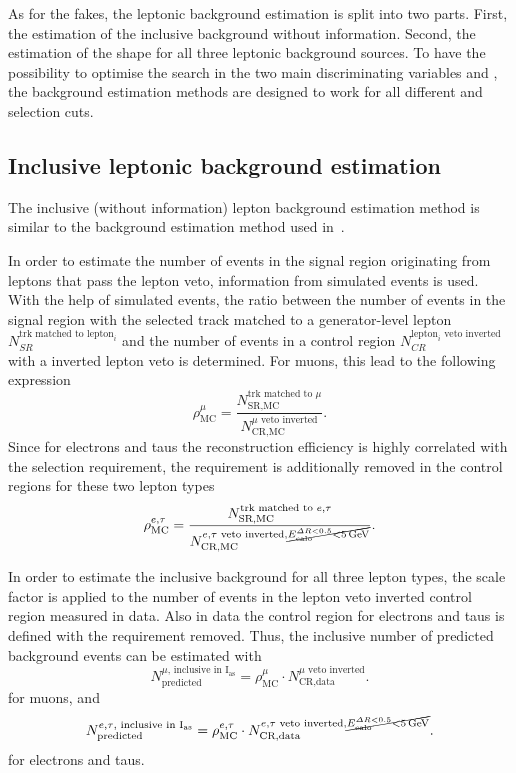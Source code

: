 As for the fakes, the leptonic background estimation is split into two parts.
First, the estimation of the inclusive background without \ias information.
Second, the estimation of the \ias shape for all three leptonic background sources.
To have the possibility to optimise the search in the two main discriminating variables \pt and \ias, the background estimation methods are designed to work for all different \pt and \ias selection cuts.

\FloatBarrier
\subsection{Inclusive leptonic background estimation}
The inclusive (without \dedx information) lepton background estimation method is similar to the background estimation method used in~\cite{bib:CMS:DT_Thesis,bib:CMS:DT_8TeV_AN}.

In order to estimate the number of events in the signal region originating from leptons that pass the lepton veto, information from simulated events is used.
With the help of simulated \WJets events, the ratio \leptonscalefactor between the number of events in the signal region with the selected track matched to a generator-level lepton $N_{SR}^{\text{trk matched to lepton}_i}$
 and the number of events in a control region $N_{CR}^{\text{lepton}_i\text{ veto inverted}}$ with a inverted lepton veto is determined.
For muons, this lead to the following expression
\begin{equation}
\rho_{\text{MC}}^{\mu} = \frac{N_{\text{SR,MC}}^{\text{trk matched to }\mu}}{N_{\text{CR,MC}}^{\mu \text{ veto inverted}}}.
\end{equation}
Since for electrons and taus the reconstruction efficiency is highly correlated with the \ecalo selection requirement, the \ecalo requirement is additionally removed in the control regions for these two lepton types 
\begin{equation}
\rho_{\text{MC}}^{e,\tau} = \frac{N_{\text{SR,MC}}^{\text{trk matched to }e,\tau}}{N_{\text{CR,MC}}^{e,\tau\text{ veto inverted}, \cancel{E^{\Delta R<0.5}_{\text{calo}}<5\,\text{Ge}\kern-0.06667em\text{V}}}}.
\end{equation}

In order to estimate the inclusive background for all three lepton types, the scale factor \leptonscalefactor is applied to the number of events in the lepton veto inverted control region measured in data.
Also in data the control region for electrons and taus is defined with the \ecalo requirement removed. 
Thus, the inclusive number of predicted background events can be estimated with  
\begin{equation}
N^{\mu \text{, inclusive in I$_{\text{as}}$}}_{\text{predicted}} = \rho_{\text{MC}}^{\mu} \cdot N_{\text{CR,data}}^{\mu\text{ veto inverted}}.
\end{equation}
for muons, and 
\begin{equation}
N^{e,\tau\text{, inclusive in I$_{\text{as}}$}}_{\text{predicted}} = \rho_{\text{MC}}^{e,\tau} \cdot N_{\text{CR,data}}^{e,\tau\text{ veto inverted}, \cancel{E^{\Delta R<0.5}_{\text{calo}}<5\,\text{Ge}\kern-0.06667em\text{V}}}.
\end{equation}
for electrons and taus.


